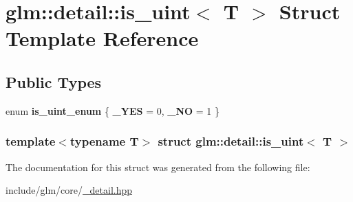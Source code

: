 \hypertarget{structglm_1_1detail_1_1is__uint}{\section{glm\-:\-:detail\-:\-:is\-\_\-uint$<$ \-T $>$ \-Struct \-Template \-Reference}
\label{structglm_1_1detail_1_1is__uint}
}
\subsection*{\-Public \-Types}
\begin{DoxyCompactItemize}
\item 
enum {\bfseries is\-\_\-uint\-\_\-enum} \{ {\bfseries \-\_\-\-Y\-E\-S} =  0, 
{\bfseries \-\_\-\-N\-O} =  1
 \}
\end{DoxyCompactItemize}
\subsubsection*{template$<$typename \-T$>$ struct glm\-::detail\-::is\-\_\-uint$<$ T $>$}



\-The documentation for this struct was generated from the following file\-:\begin{DoxyCompactItemize}
\item 
include/glm/core/\hyperlink{__detail_8hpp}{\-\_\-detail.\-hpp}\end{DoxyCompactItemize}

